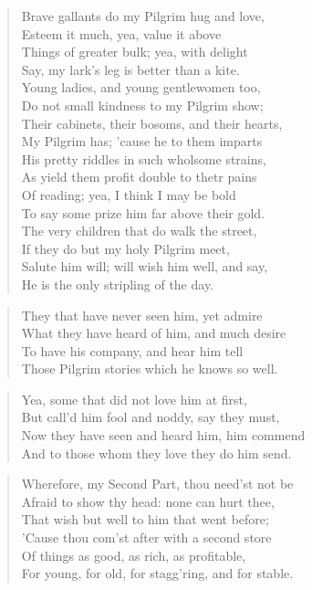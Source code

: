 \begin{verse}
Brave gallants do my Pilgrim hug and love,\\
Esteem it much, yea, value it above\\
Things of greater bulk; yea, with delight\\
Say, my lark's leg is better than a kite.\\
Young ladies, and young gentlewomen too,\\
Do not small kindness to my Pilgrim show;\\
Their cabinets, their bosoms, and their hearts,\\
My Pilgrim has; 'cause he to them imparts\\
His pretty riddles in such wholsome strains,\\
As yield them profit double to thetr pains\\
Of reading; yea, I think I may be bold\\
To say some prize him far above their gold.\\
The very children that do walk the street,\\
If they do but my holy Pilgrim meet,\\
Salute him will; will wish him well, and say,\\
He is the only stripling of the day.\\
\end{verse}
\begin{verse}
They that have never seen him, yet admire\\
What they have heard of him, and much desire\\
To have his company, and hear him tell\\
Those Pilgrim stories which he knows so well.\\
\end{verse}
\begin{verse}
Yea, some that did not love him at first,\\
But call'd him fool and noddy, say they must,\\
Now they have seen and heard him, him commend\\
And to those whom they love they do him send.\\
\end{verse}
\begin{verse}
Wherefore, my Second Part, thou need'st not be\\
Afraid to show thy head: none can hurt thee,\\
That wish but well to him that went before;\\
'Cause thou com'st after with a second store\\
Of things as good, as rich, as profitable,\\
For young, for old, for stagg'ring, and for stable.\\
\end{verse}
